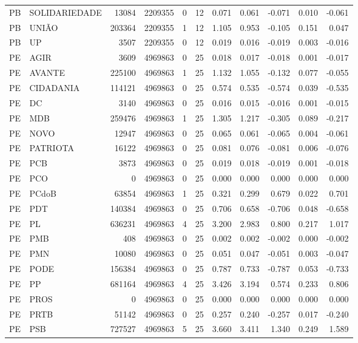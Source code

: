 \begin{landscape}
\begin{longtable}{llrrrrrrrrr}
PB & SOLIDARIEDADE & 13084 & 2209355 & 0 & 12 & 0.071 & 0.061 & -0.071 & 0.010 & -0.061 \\
PB & UNIÃO & 203364 & 2209355 & 1 & 12 & 1.105 & 0.953 & -0.105 & 0.151 & 0.047 \\
PB & UP & 3507 & 2209355 & 0 & 12 & 0.019 & 0.016 & -0.019 & 0.003 & -0.016 \\
PE & AGIR & 3609 & 4969863 & 0 & 25 & 0.018 & 0.017 & -0.018 & 0.001 & -0.017 \\
PE & AVANTE & 225100 & 4969863 & 1 & 25 & 1.132 & 1.055 & -0.132 & 0.077 & -0.055 \\
PE & CIDADANIA & 114121 & 4969863 & 0 & 25 & 0.574 & 0.535 & -0.574 & 0.039 & -0.535 \\
PE & DC & 3140 & 4969863 & 0 & 25 & 0.016 & 0.015 & -0.016 & 0.001 & -0.015 \\
PE & MDB & 259476 & 4969863 & 1 & 25 & 1.305 & 1.217 & -0.305 & 0.089 & -0.217 \\
PE & NOVO & 12947 & 4969863 & 0 & 25 & 0.065 & 0.061 & -0.065 & 0.004 & -0.061 \\
PE & PATRIOTA & 16122 & 4969863 & 0 & 25 & 0.081 & 0.076 & -0.081 & 0.006 & -0.076 \\
PE & PCB & 3873 & 4969863 & 0 & 25 & 0.019 & 0.018 & -0.019 & 0.001 & -0.018 \\
PE & PCO & 0 & 4969863 & 0 & 25 & 0.000 & 0.000 & 0.000 & 0.000 & 0.000 \\
PE & PCdoB & 63854 & 4969863 & 1 & 25 & 0.321 & 0.299 & 0.679 & 0.022 & 0.701 \\
PE & PDT & 140384 & 4969863 & 0 & 25 & 0.706 & 0.658 & -0.706 & 0.048 & -0.658 \\
PE & PL & 636231 & 4969863 & 4 & 25 & 3.200 & 2.983 & 0.800 & 0.217 & 1.017 \\
PE & PMB & 408 & 4969863 & 0 & 25 & 0.002 & 0.002 & -0.002 & 0.000 & -0.002 \\
PE & PMN & 10080 & 4969863 & 0 & 25 & 0.051 & 0.047 & -0.051 & 0.003 & -0.047 \\
PE & PODE & 156384 & 4969863 & 0 & 25 & 0.787 & 0.733 & -0.787 & 0.053 & -0.733 \\
PE & PP & 681164 & 4969863 & 4 & 25 & 3.426 & 3.194 & 0.574 & 0.233 & 0.806 \\
PE & PROS & 0 & 4969863 & 0 & 25 & 0.000 & 0.000 & 0.000 & 0.000 & 0.000 \\
PE & PRTB & 51142 & 4969863 & 0 & 25 & 0.257 & 0.240 & -0.257 & 0.017 & -0.240 \\
PE & PSB & 727527 & 4969863 & 5 & 25 & 3.660 & 3.411 & 1.340 & 0.249 & 1.589 \\

\end{longtable}
\end{landscape}
